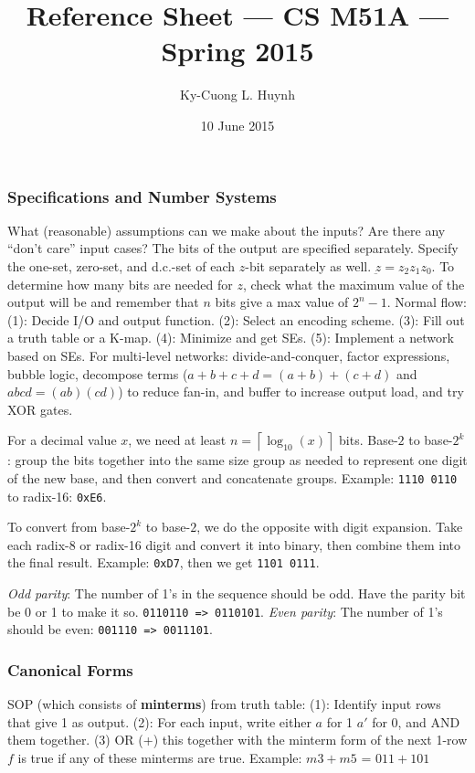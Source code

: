 \documentclass[10pt,letterpaper,twocolumn]{article}
\title{Reference Sheet --- CS M51A
                       --- Spring 2015}
\author{Ky-Cuong L. Huynh}
\date{10 June 2015}
\begin{document}
 

\maketitle
\frenchspacing

\subsubsection{Specifications and Number Systems}

What (reasonable) assumptions can we make 
about the inputs?
Are there any ``don't care'' input cases?
The bits of the output are
specified separately. Specify the one-set, 
zero-set, and d.c.-set of each $ z $-bit 
separately as well. $ \underbar{z} = z_2z_1z_0 $.
To determine how many bits are needed for $ z $, 
check what the maximum value of the output will be
and remember that $ n $ bits give a max value of
$ 2^n - 1 $. Normal flow: 
(1): Decide I/O and output function. 
(2): Select an encoding scheme. (3): Fill out 
a truth table or a K-map. (4): Minimize and 
get SEs. (5): Implement a network based on SEs.
For multi-level networks: divide-and-conquer, 
factor expressions, bubble logic, 
decompose terms ($ a + b +c + d = (a+b) + (c+d) $
and $ abcd = (ab)(cd) $) to reduce fan-in, and 
buffer to increase output load, and try XOR gates.

For a decimal value $ x $, 
we need at least $ n = \left\lceil \log_{10}(x) 
\right\rceil $ bits. 
Base-$2$ to base-$2^k$: group the
bits together into the same size group
as needed to represent one digit of the new 
base, and then convert and concatenate groups.
Example: \texttt{1110 0110} to
radix-16: \texttt{0xE6}.

To convert from base-$2^k$ to base-$2$, 
we do the opposite with digit expansion. 
Take each radix-8 or radix-16 digit
and convert it into binary, then combine 
them into the final result. Example:
\texttt{0xD7}, then we get \texttt{1101 0111}. 

\emph{Odd parity}: The number of 1's in the 
sequence should be odd. Have the parity bit 
be 0 or 1 to make it so. \texttt{0110110 => 0110101}.
\emph{Even parity}: The number of 1's should be even:
\texttt{001110 => 0011101}.

\subsubsection{Canonical Forms}

SOP (which consists
of \textbf{minterms}) from truth table: 
(1): Identify input rows that give 
1 as output. (2): For each input, write 
either $ a $ for 1 $ a' $ for 0, and 
AND them together. (3) OR (+) this together
with the minterm form of the next 1-row 
$ f $ is true if any of these minterms are true.
Example: $ m3 + m5 $ = $ 011 + 101 $
\end{document}
